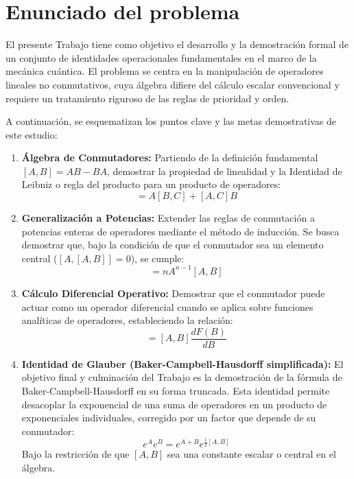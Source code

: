 \documentclass[11pt,a4paper,spanish]{book}
\begin{document}
\chapter{Enunciado del problema}

El presente Trabajo tiene como objetivo el desarrollo y la demostración formal de un conjunto de identidades operacionales fundamentales en el marco de la mecánica cuántica. El problema se centra en la manipulación de operadores lineales no conmutativos, cuya álgebra difiere del cálculo escalar convencional y requiere un tratamiento riguroso de las reglas de prioridad y orden.

A continuación, se esquematizan los puntos clave y las metas demostrativas de este estudio:

\begin{enumerate}
    \item \textbf{Álgebra de Conmutadores:} Partiendo de la definición fundamental $[A, B] = AB - BA$, demostrar la propiedad de linealidad y la Identidad de Leibniz o regla del producto para un producto de operadores:
    \begin{equation*}
        [AB, C] = A[B, C] + [A, C]B
    \end{equation*}

    \item \textbf{Generalización a Potencias:} Extender las reglas de conmutación a potencias enteras de operadores mediante el método de inducción. Se busca demostrar que, bajo la condición de que el conmutador sea un elemento central ($[A, [A, B]] = 0$), se cumple:
    \begin{equation*}
        [A^n, B] = n A^{n-1} [A, B]
    \end{equation*}

    \item \textbf{Cálculo Diferencial Operativo:} Demostrar que el conmutador puede actuar como un operador diferencial cuando se aplica sobre funciones analíticas de operadores, estableciendo la relación:
    \begin{equation*}
        [A, F(B)] = [A, B] \frac{dF(B)}{dB}
    \end{equation*}



    \item \textbf{Identidad de Glauber (Baker-Campbell-Hausdorff simplificada):} El objetivo final y culminación del Trabajo es la demostración de la fórmula de Baker-Campbell-Hausdorff en su forma truncada. Esta identidad permite desacoplar la exponencial de una suma de operadores en un producto de exponenciales individuales, corregido por un factor que depende de su conmutador:
    \begin{equation*}
        e^A e^B = e^{A+B} e^{\frac{1}{2}[A, B]}
    \end{equation*}
    Bajo la restricción de que $[A, B]$ sea una constante escalar o central en el álgebra.
\end{enumerate}
\end{document}
